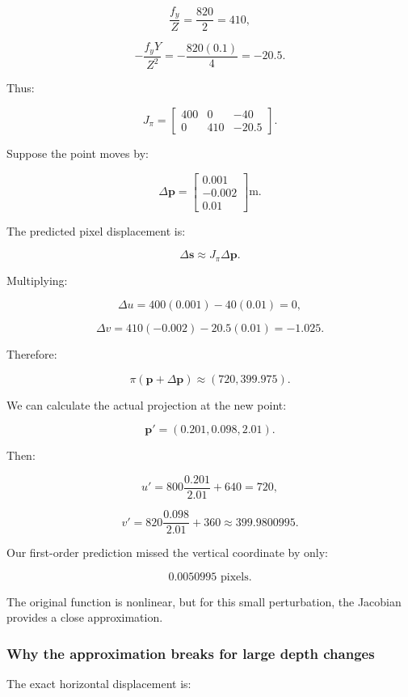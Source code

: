 \[
\frac{f_y}{Z}=\frac{820}{2}=410,
\]

\[
-\frac{f_yY}{Z^2} =-\frac{820(0.1)}4=-20.5.
\]

Thus:

\[
\boxed{ J_\pi= \begin{bmatrix} 400&0&-40\\ 0&410&-20.5 \end{bmatrix} }.
\]

Suppose the point moves by:

\[
\Delta\mathbf p= \begin{bmatrix} 0.001\\ -0.002\\ 0.01 \end{bmatrix}\mathrm m.
\]

The predicted pixel displacement is:

\[
\Delta\mathbf s \approx J_\pi\Delta\mathbf p.
\]

Multiplying:

\[
\Delta u =400(0.001)-40(0.01)=0,
\]

\[
\Delta v =410(-0.002)-20.5(0.01)=-1.025.
\]

Therefore:

\[
\boxed{ \pi(\mathbf p+\Delta\mathbf p) \approx(720,399.975) }.
\]

We can calculate the actual projection at the new point:

\[
\mathbf p'=(0.201,0.098,2.01).
\]

Then:

\[
u'=800\frac{0.201}{2.01}+640=720,
\]

\[
v'=820\frac{0.098}{2.01}+360 \approx399.9800995.
\]

Our first-order prediction missed the vertical coordinate by only:

\[
\boxed{0.0050995\text{ pixels}}.
\]

The original function is nonlinear, but for this small perturbation, the Jacobian provides a close approximation.

\subsubsection{Why the approximation breaks for large depth changes}\label{02-foundations-ii-ch021-why-the-approximation-breaks-for-large-depth-changes}

\hypertarget{02-foundations-ii-ch021-why-the-approximation-breaks-for-large-depth-changes}{}

The exact horizontal displacement is:


